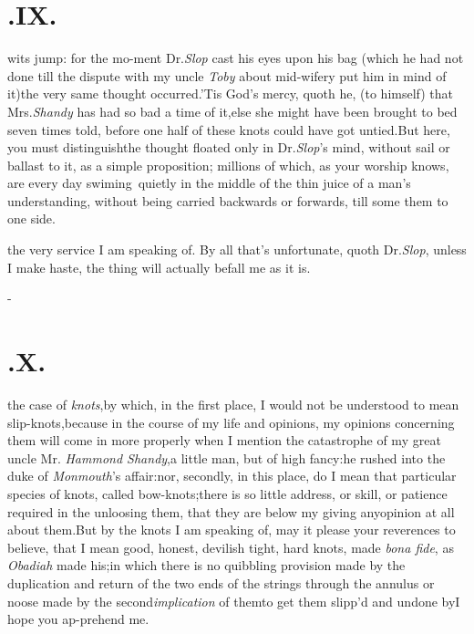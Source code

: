 \documentclass{article}
\begin{document}
\section{.\quad  IX.}

 wits jump: for the mo-\break ment Dr.\@ \textit{Slop} cast his eyes upon\break
his bag (which he
had not done till the dispute with my uncle \textit{Toby} about mid-wifery put him
in mind of it)\tsk the very same thought occurred.\tsh ’Tis God’s mercy, quoth he, (to
himself) that Mrs.\@ \textit{Shandy} has had so bad a time of it,\tsh else she might
have been brought to bed seven times told, before one half of these knots could have
got untied.\tsh But here, you must distinguish\tsh the\break
thought floated only in Dr.\@ \textit{Slop}’s mind,\break
without sail or ballast to it, as a simple proposition;
millions of which, as your worship knows, are every day swiming\sic\ quietly in the
middle of the thin juice of a man’s understanding, without being carried backwards
or forwards, till some\break
{} them to one side.

  the very service I am speaking of. By
all that’s unfortunate, quoth Dr.\@ \textit{Slop}, unless I make
haste, the thing will actually befall me as it is.

\vfill{}\eject

\null\kern-\baselineskip
\section{.\quad  X.}

 the case of \textit{knots},\tsh by which, in\break
the first place, I would not be under\-stood to mean slip-knots,\tsk because in the course of my life and
opinions,\tsh\break
my opinions concerning them will come in more properly when I mention the
catastrophe of my great uncle Mr.  \textit{Hammond Shandy},\tsk a little man,\tsk
but of\break
high fancy:\tsk he rushed into the duke of \textit{Monmouth}’s affair:\tsh nor,
secondly, in this place, do I mean that particular species of knots, called
bow-knots;\tsk there is so little address, or skill, or patience required in the
unloosing them, that they are below my giving any\break opinion at all about them.\tsk But
by the knots I am speaking of, may it please your reverences to believe, that I
mean
good, honest, devilish tight, hard knots, made \textit{bona fide}, as
\textit{Obadiah} made his;\tsh in which there is no quibbling provision made by the
duplication and return of the two ends of the strings through the annulus or noose
made by the second\break\textit{implication} of them\tsk to get them slipp’d and
undone by\tsh\tsh I hope you ap-\break prehend me.
\end{document}
